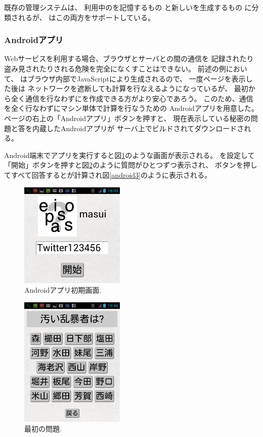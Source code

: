 \documentclass[twoside]{wiss}
\begin{document}
既存の{\PW}管理システムは、
利用中の{\PW}を記憶するもの%
\cite{OnePassword}%
\cite{Dashlane}%
\cite{ミルパス}%
\cite{LastPass}%
\cite{KeyPass}%
\cite{NortonIDSafe}%
\cite{IDManager}%
と新しい{\PW}を生成するもの%
\cite{SuperGenPass}%
に分類されるが、
{\EP}はこの両方をサポートしている。

\subsubsection{Androidアプリ}

Webサービスを利用する場合、ブラウザとサーバとの間の通信を
記録されたり盗み見されたりされる危険を完全になくすことはできない。
前述の例において、
{\PW}はブラウザ内部でJavaScriptにより生成されるので、
一度ページを表示した後は
ネットワークを遮断しても{\PW}計算を行なえるようになっているが、
最初から全く通信を行なわずに{\PW}を作成できる方がより安心であろう。
このため、通信を全く行なわずにマシン単体で{\PW}計算を行なうための
Androidアプリを用意した。
ページの右上の「Androidアプリ」ボタンを押すと、
現在表示している秘密の問題と答を内蔵したAndroidアプリが
サーバ上でビルドされてダウンロードされる。

Android端末でアプリを実行すると図\ref{android1}のような画面が表示される。
{\SS}を設定して「開始」ボタンを押すと図\ref{android2}のように質問がひとつずつ表示され、
ボタンを押してすべて回答すると{\PW}が計算され図\ref{android3}のように表示される。

\begin{figure}[H]
\centerline{\includegraphics[width=50mm,bb=0 0 720 720]{figures/android1crop.png}}
\caption{Androidアプリ初期画面.}
\label{android1}
\end{figure}

\begin{figure}[H]
\centerline{\includegraphics[width=50mm,bb=0 0 720 900]{figures/android2crop.png}}
\caption{最初の問題.}
\label{android2}
\end{figure}
\end{document}
